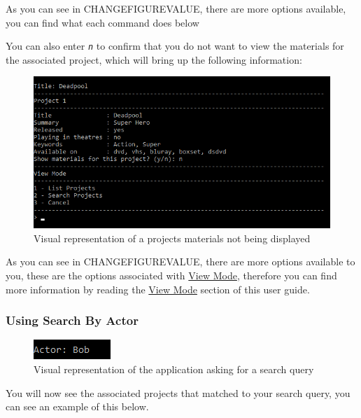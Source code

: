 \documentclass[
  english,
  a4paper,
,tablecaptionabove
]{scrartcl}
\begin{document}
As you can see in CHANGEFIGUREVALUE, there are more options available,
you can find what each command does below

You can also enter \emph{\texttt{n}} to confirm that you do not want to
view the materials for the associated project, which will bring up the
following information:

\begin{figure}
\centering
\includegraphics{images/user-guide/view-mode/project-search-materials-decline.png}
\caption{Visual representation of a projects materials not being
displayed}
\end{figure}

As you can see in CHANGEFIGUREVALUE, there are more options available to
you, these are the options associated with
\protect\hyperlink{using-view-mode}{View Mode}, therefore you can find
more information by reading the \protect\hyperlink{using-view-mode}{View
Mode} section of this user guide.

\newpage

\hypertarget{using-search-by-actor}{%
\subsubsection{Using Search By Actor}\label{using-search-by-actor}}

\begin{figure}
\centering
\includegraphics{images/user-guide/view-mode/project-actor-search.png}
\caption{Visual representation of the application asking for a search
query}
\end{figure}

You will now see the associated projects that matched to your search
query, you can see an example of this below.
\end{document}
